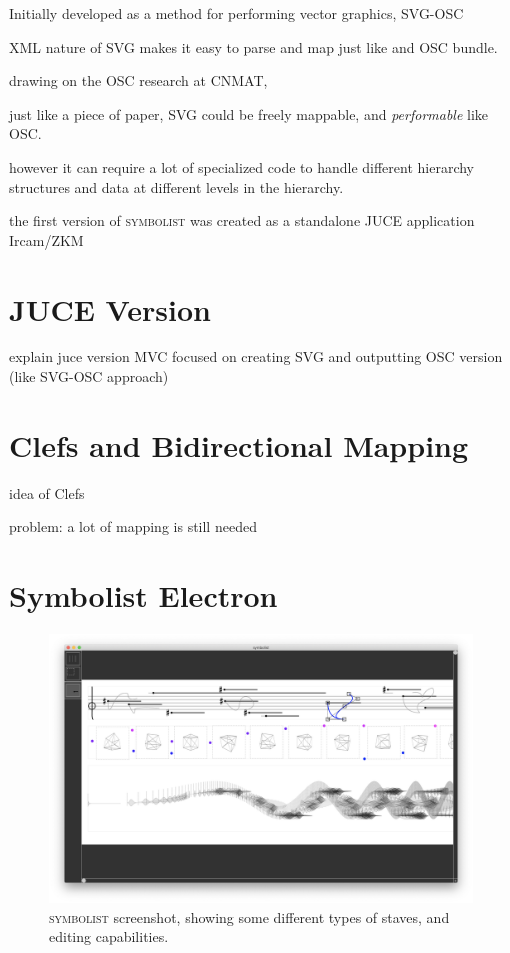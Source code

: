 \documentclass{article}
\def\symbolist{\textsc{symbolist}\xspace}
\begin{document}
Initially developed as a method for performing vector graphics, 
SVG-OSC

XML nature of SVG makes it easy to parse and map just like and OSC bundle.

drawing on the OSC research at CNMAT, 

just like a piece of paper, SVG could be freely mappable, and \textit{performable} like OSC.





however it can require a lot of specialized code to handle different hierarchy structures and data at different levels in the hierarchy.


the first version of \symbolist was created as a standalone JUCE application
Ircam/ZKM \cite{gottfried2018symbolist}

\section{JUCE Version}\label{sec:juce_version}

explain juce version
MVC
focused on creating SVG and outputting OSC version (like SVG-OSC approach)


\section{Clefs and Bidirectional Mapping}\label{sec:bidirectional_mapping}

idea of Clefs

problem:
a lot of mapping is still needed



\section{Symbolist Electron}\label{sec:symbolist_electron}

\begin{figure}[ht!]
\centering
\includegraphics[width=2\columnwidth]{symbolist.png}
\caption{ \symbolist screenshot, showing some different types of staves, and editing capabilities.
\label{fig:screenshot}}
\end{figure}
\end{document}
